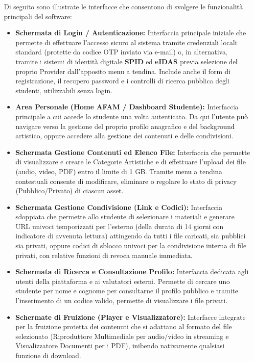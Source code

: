 \documentclass[12pt,a4paper]{article}
\newcommand{\spaziocontenuto}{\mbox{}\par\vspace{1.2cm}}
\begin{document}
Di seguito sono illustrate le interfacce che consentono di svolgere le funzionalità principali del software:
\begin{itemize}
    \item \textbf{Schermata di Login / Autenticazione:} Interfaccia principale iniziale che permette di effettuare l'accesso sicuro al sistema tramite credenziali locali standard (protette da codice OTP inviato via e-mail) o, in alternativa, tramite i sistemi di identità digitale \textbf{SPID} ed \textbf{eIDAS} previa selezione del proprio Provider dall'apposito menu a tendina. Include anche il form di registrazione, il recupero password e i controlli di ricerca pubblica degli studenti, utilizzabili senza login.
    \item \textbf{Area Personale (Home AFAM / Dashboard Studente):} Interfaccia principale a cui accede lo studente una volta autenticato. Da qui l'utente può navigare verso la gestione del proprio profilo anagrafico e del background artistico, oppure accedere alla gestione dei contenuti e delle condivisioni.
    \item \textbf{Schermata Gestione Contenuti ed Elenco File:} Interfaccia che permette di visualizzare e creare le Categorie Artistiche e di effettuare l'upload dei file (audio, video, PDF) entro il limite di 1 GB. Tramite menu a tendina contestuali consente di modificare, eliminare o regolare lo stato di privacy (Pubblico/Privato) di ciascun asset.
    \item \textbf{Schermata Gestione Condivisione (Link e Codici):} Interfaccia sdoppiata che permette allo studente di selezionare i materiali e generare URL univoci temporizzati per l'esterno (della durata di 14 giorni con indicatore di avvenuta lettura) attingendo da tutti i file caricati, sia pubblici sia privati, oppure codici di sblocco univoci per la condivisione interna di file privati, con relative funzioni di revoca manuale immediata.
    \item \textbf{Schermata di Ricerca e Consultazione Profilo:} Interfaccia dedicata agli utenti della piattaforma e ai valutatori esterni. Permette di cercare uno studente per nome e cognome per consultarne il profilo pubblico e tramite l'inserimento di un codice valido, permette di visualizzare i file privati.
    \item \textbf{Schermate di Fruizione (Player e Visualizzatore):} Interfacce integrate per la fruizione protetta dei contenuti che si adattano al formato del file selezionato (Riproduttore Multimediale per audio/video in streaming e Visualizzatore Documenti per i PDF), inibendo nativamente qualsiasi funzione di download.
\end{itemize}
\spaziocontenuto
\end{document}
